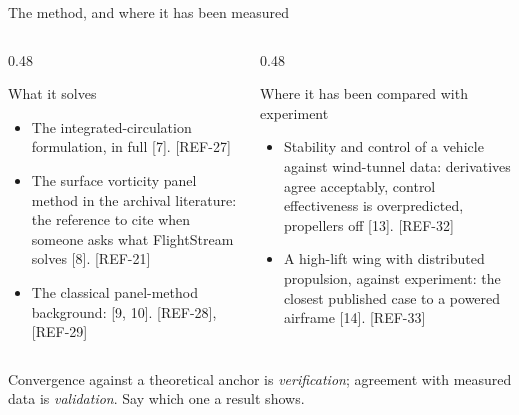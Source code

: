 \begin{frame}[shrink=3]{The method, and where it has been measured}
\begin{columns}[T]
\begin{column}{0.48\textwidth}
\begin{block}{What it solves}
\begin{itemize}\small
  \item The integrated-circulation formulation, in full [7]. [REF-27]
  \item The surface vorticity panel method in the archival literature: the
        reference to cite when someone asks what FlightStream solves [8]. [REF-21]
  \item The classical panel-method background: [9, 10]. [REF-28], [REF-29]
\end{itemize}
\end{block}
\end{column}
\begin{column}{0.48\textwidth}
\begin{block}{Where it has been compared with experiment}
\begin{itemize}\small
  \item Stability and control of a vehicle against wind-tunnel data:
        derivatives agree acceptably, control effectiveness is overpredicted,
        propellers off [13]. [REF-32]
  \item A high-lift wing with distributed propulsion, against experiment: the
        closest published case to a powered airframe [14]. [REF-33]
\end{itemize}
\end{block}
\end{column}
\end{columns}
\vspace{1mm}
\begin{takeaway}Convergence against a theoretical anchor is
\emph{verification}; agreement with measured data is \emph{validation}. Say
which one a result shows.\end{takeaway}
\end{frame}
